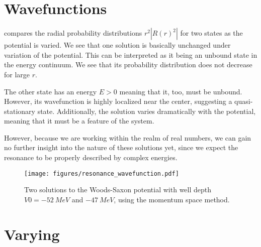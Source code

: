\section{Wavefunctions}

 compares the radial probability distributions $r^2|R(r)^2|$ for two states as the potential is varied. We see that one solution is basically unchanged under variation of the potential. This can be interpreted as it being an unbound state in the energy continuum. We see that its probability distribution does not decrease for large $r$.

The other state has an energy $E>0$ meaning that it, too, must be unbound. However, its wavefunction is highly localized near the center, suggesting a quasi-stationary state. Additionally, the solution varies dramatically with the potential, meaning that it must be a feature of the system. 

However, because we are working within the realm of real numbers, we can gain no further insight into the nature of these solutions yet, since we expect the resonance to be properly described by complex energies. 


\begin{figure}
  \centering
  \texttt{[image: figures/resonance\_wavefunction.pdf]}
  \caption{Two solutions to the Woods-Saxon potential with well depth $V0=\SI{-52}{MeV}$ and $\SI{-47}{MeV}$, using the momentum space method.}
  \label{fig:resonance wavefunction}
\end{figure}

\section{Varying \omega}
